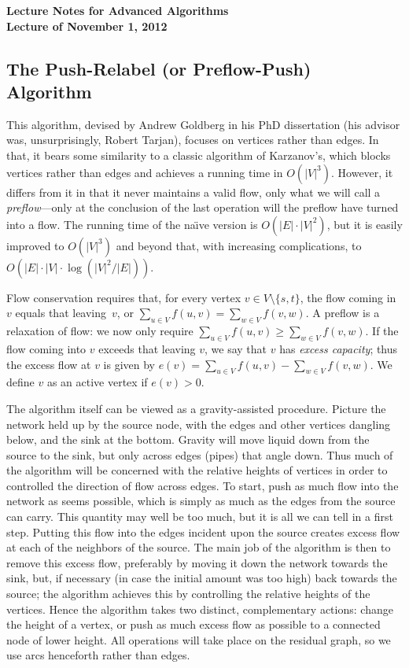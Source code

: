 \documentclass{article}
\begin{document}
\begin{center}
  \Large\bf
  Lecture Notes for Advanced Algorithms\\

  \medskip
  \large\sf
  Lecture of November 1, 2012\\
\end{center}

		
\subsection*{The Push-Relabel (or Preflow-Push) Algorithm}
This algorithm, devised by Andrew Goldberg in his PhD dissertation (his
advisor was, unsurprisingly, Robert Tarjan), focuses on vertices rather than
edges.  In that, it bears
some similarity to a classic algorithm of Karzanov's, which blocks vertices
rather than edges and achieves a running time in $O(|V|^{3})$.  However,
it differs from it in that it never maintains a valid flow, only what
we will call a \emph{preflow}---only at the conclusion of the last
operation will the preflow have turned into a flow.  The running time
of the na\"\i{}ve version is $O(|E|\cdot |V|^2)$, but it is easily
improved to $O(|V|^3)$ and beyond that, with increasing complications,
to $O(|E|\cdot |V|\cdot\log(|V|^2/|E|))$.

Flow conservation requires that, for every vertex $v\in V\setminus\{s,t\}$,
the flow coming in $v$ equals that leaving~$v$, or $\sum_{u\in V} f(u,v)=\sum_{w\in V} f(v,w)$.
A preflow is a relaxation of flow: we now only require $\sum_{u\in V} f(u,v) \geq \sum_{w\in V} f(v,w)$.
If the flow coming into $v$ exceeds that leaving $v$, we say that $v$
has \emph{excess capacity}; thus the excess flow at $v$ is given by
$e(v) = \sum_{u\in V} f(u,v) - \sum_{w\in V} f(v,w)$. 
We define $v$ as an active vertex if $e(v)>0$.

The algorithm itself can be viewed as a gravity-assisted procedure.
Picture the network held up by the source node, with the edges and
other vertices dangling below, and the sink at the bottom.
Gravity will move liquid down from the source to the sink, but
only across edges (pipes) that angle down.  Thus much of the
algorithm will be concerned with the relative heights of vertices
in order to controlled the direction of flow across edges.
To start, push as much flow into the network as seems possible,
which is simply as much as the edges from the source can carry.
This quantity may well be too much, but it is all we can tell
in a first step.  Putting this flow into the edges incident upon
the source creates excess flow at each of the neighbors of the source.
The main job of the algorithm is then to remove this excess flow,
preferably by moving it down the network towards the sink, but, if
necessary (in case the initial amount was too high) back towards
the source; the algorithm achieves this by controlling the relative
heights of the vertices.  Hence the algorithm takes two distinct,
complementary actions: change the height of a vertex, or push as much
excess flow as possible to a connected node of lower height.
All operations will take place on the residual graph, so we use
arcs henceforth rather than edges.
\end{document}
